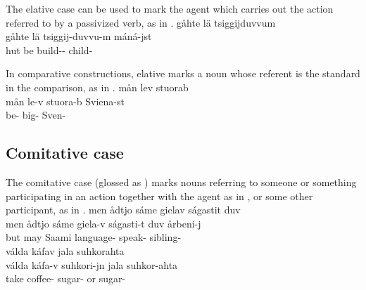 The elative case can be used to mark the agent which carries out the action referred to by a passivized verb, as in .
\ea\label{elat5b}%
\glll	gåhte lä tsiggijduvvum \\
	gåhte lä tsiggij-duvvu-m máná-jst\\
	hut\BS{} be\BS{} build-- child-\\\nopagebreak
{}	
\z

In comparative constructions, elative marks a noun whose referent is the standard in the comparison, as in .
\ea\label{elat7}
\glll	mån lev stuorab \\
	mån le-v stuora-b Sviena-st\\
	 be- big- Sven-\\ %
 
\z


\subsection{Comitative case}\label{comitative}
The comitative case (glossed as \COMs) marks nouns referring to someone or something participating in an action together with the agent as in , or some other participant, as in .
\ea\label{com1}
\glll	men ådtjo sáme gielav ságastit duv \\
	men ådtjo sáme giela-v ságasti-t duv årbeni-j\\
	but may\BS{} Saami\BS{} language- speak-  sibling-\\\nopagebreak
{} 
\z
\ea\label{com1b}
\glll	válda káfav  jala suhkorahta\\
	válda káfa-v suhkori-jn jala suhkor-ahta\\
	take\BS{} coffee- sugar- or sugar-\\\nopagebreak
{} 
\z

